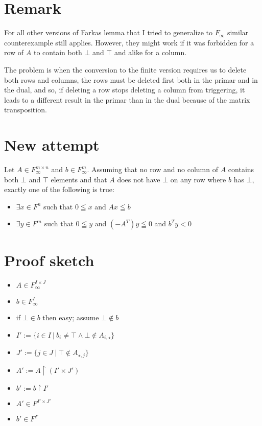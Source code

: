 \documentclass[]{article}
\begin{document}
\section{Remark}

For all other versions of Farkas lemma
that I tried to generalize to $F_\infty$
similar counterexample still applies.
However, they might work if it was forbidden
for a row of $A$ to contain both $\bot$ and $\top$
and alike for a column.

The problem is when the conversion to the finite
version requires us to delete both rows and columns,
the rows must be deleted first both in the primar
and in the dual, and so, if deleting a row stops
deleting a column from triggering, it leads to a
different result in the primar than in the dual
because of the matrix transposition.

\newpage
\section{New attempt}

Let $A \in F_\infty^{m \times n}$ and $b \in F_\infty^m$.
Assuming that no row and no column of $A$ contains
both $\bot$ and $\top$ elements and that
$A$ does not have $\bot$ on any row where $b$ has $\bot$,
exactly one of the following is true:
\begin{itemize}
	\item $\exists x \in F^n$ such that
	$0 \leqq x$ and $A x \leqq b$
	\item $\exists y \in F^m$ such that
	$0 \leqq y$ and $(-A^T) y \leqq 0$ and $b^T y < 0$
\end{itemize}

\section{Proof sketch}

\begin{itemize}
\item $ A \in F_\infty^{I \times J} $
\item $ b \in F_\infty^{I} $
\item if $\bot \in b$ then easy; assume $\bot \notin b$
\item $ I' := \{ i \in I ~|~ b_i \neq \top \wedge \bot \notin A_{i, \star}  \} $
\item $ J' := \{ j \in J ~|~ \top \notin A_{\star, j}  \} $
\item $ A' := A \restriction (I' \times J') $
\item $ b' := b \restriction I' $
\item $ A' \in F^{I' \times J'} $
\item $ b' \in F^{I'} $
\end{itemize}
\end{document}
